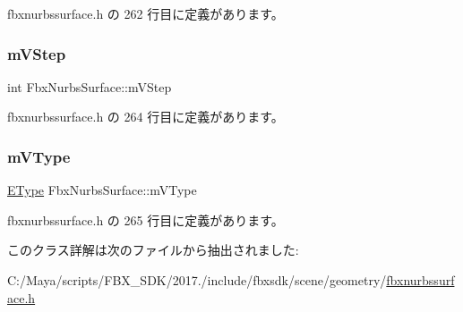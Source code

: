  fbxnurbssurface.\+h の 262 行目に定義があります。

\mbox{\label{class_fbx_nurbs_surface_a3b9b47f98eb0a4177366c172e32adea5}} 
\subsubsection{\texorpdfstring{m\+V\+Step}{mVStep}}
{\footnotesize\ttfamily int Fbx\+Nurbs\+Surface\+::m\+V\+Step\hspace{0.3cm}{\ttfamily [protected]}}



 fbxnurbssurface.\+h の 264 行目に定義があります。

\mbox{\label{class_fbx_nurbs_surface_a2c836673f55f882dcdc6a86dbac716c0}} 
\subsubsection{\texorpdfstring{m\+V\+Type}{mVType}}
{\footnotesize\ttfamily \hyperlink{class_fbx_nurbs_surface_a87c1fcd98d8fa511ee6c6166346a46b3}{E\+Type} Fbx\+Nurbs\+Surface\+::m\+V\+Type\hspace{0.3cm}{\ttfamily [protected]}}



 fbxnurbssurface.\+h の 265 行目に定義があります。



このクラス詳解は次のファイルから抽出されました\+:\begin{DoxyCompactItemize}
\item 
C\+:/\+Maya/scripts/\+F\+B\+X\+\_\+\+S\+D\+K/2017./include/fbxsdk/scene/geometry/\hyperlink{fbxnurbssurface_8h}{fbxnurbssurface.\+h}\end{DoxyCompactItemize}
